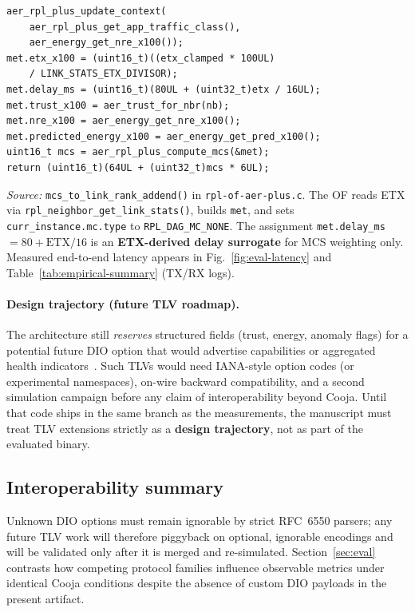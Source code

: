 \begin{lstlisting}[style=csnippet]
aer_rpl_plus_update_context(
    aer_rpl_plus_get_app_traffic_class(),
    aer_energy_get_nre_x100());
met.etx_x100 = (uint16_t)((etx_clamped * 100UL)
    / LINK_STATS_ETX_DIVISOR);
met.delay_ms = (uint16_t)(80UL + (uint32_t)etx / 16UL);
met.trust_x100 = aer_trust_for_nbr(nb);
met.nre_x100 = aer_energy_get_nre_x100();
met.predicted_energy_x100 = aer_energy_get_pred_x100();
uint16_t mcs = aer_rpl_plus_compute_mcs(&met);
return (uint16_t)(64UL + (uint32_t)mcs * 6UL);
\end{lstlisting}

\begingroup\sloppy
\noindent\textit{Source:} \texttt{mcs\_to\_link\_rank\_addend()} in \texttt{rpl-of-aer-plus.c}.
The OF reads ETX via \texttt{rpl\_neighbor\_get\_link\_stats()}, builds \texttt{met}, and sets \texttt{curr\_instance.mc.type} to \texttt{RPL\_DAG\_MC\_NONE}.
The assignment \texttt{met.delay\_ms}${=}80{+}\mathrm{ETX}/16$ is an \textbf{ETX-derived delay surrogate} for MCS weighting only.
Measured end-to-end latency appears in Fig.~\ref{fig:eval-latency} and Table~\ref{tab:empirical-summary} (TX/RX logs).
\endgroup

\paragraph{Design trajectory (future TLV roadmap).}
The architecture still \emph{reserves} structured fields (trust, energy, anomaly flags) for a potential future DIO option that would advertise capabilities or aggregated health indicators~\cite{rfc6550}. Such TLVs would need IANA-style option codes (or experimental namespaces), on-wire backward compatibility, and a second simulation campaign before any claim of interoperability beyond Cooja. Until that code ships in the same branch as the measurements, the manuscript must treat TLV extensions strictly as a \textbf{design trajectory}, not as part of the evaluated binary.

\subsection{Interoperability summary}
Unknown DIO options must remain ignorable by strict RFC~6550 parsers; any future TLV work will therefore piggyback on optional, ignorable encodings and will be validated only after it is merged and re-simulated. Section~\ref{sec:eval} contrasts how competing protocol families influence observable metrics under identical Cooja conditions despite the absence of custom DIO payloads in the present artifact.

